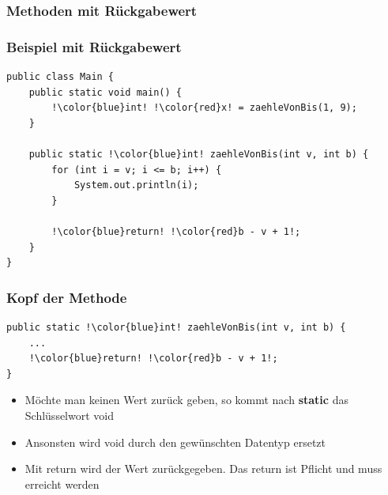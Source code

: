 \documentclass[final]{beamer}
\begin{document}
\subsubsection{Methoden mit Rückgabewert}
\begin{frame}[containsverbatim]
	\frametitle{Beispiel mit Rückgabewert}
	\begin{lstlisting}[escapechar=!]
public class Main {
	public static void main() {
		!\color{blue}int! !\color{red}x! = zaehleVonBis(1, 9);
	}
	
	public static !\color{blue}int! zaehleVonBis(int v, int b) {
		for (int i = v; i <= b; i++) {
			System.out.println(i);
		}
		
		!\color{blue}return! !\color{red}b - v + 1!;
	}
}
	\end{lstlisting}
\end{frame}

\begin{frame}[containsverbatim]
	\frametitle{Kopf der Methode}
	\begin{lstlisting}[escapechar=!]
public static !\color{blue}int! zaehleVonBis(int v, int b) {
	...
	!\color{blue}return! !\color{red}b - v + 1!;
}
	\end{lstlisting}
	\begin{itemize}
		\item{Möchte man keinen Wert zurück geben, so kommt nach \textbf{static} das Schlüsselwort \color{blue}void}
		\item{Ansonsten wird {\color{blue}void} durch den gewünschten Datentyp ersetzt}
		\item{Mit {\color{blue}return} wird der Wert zurückgegeben. Das {\color{blue}return} ist Pflicht und muss erreicht werden}
	\end{itemize}
\end{frame}
\end{document}
